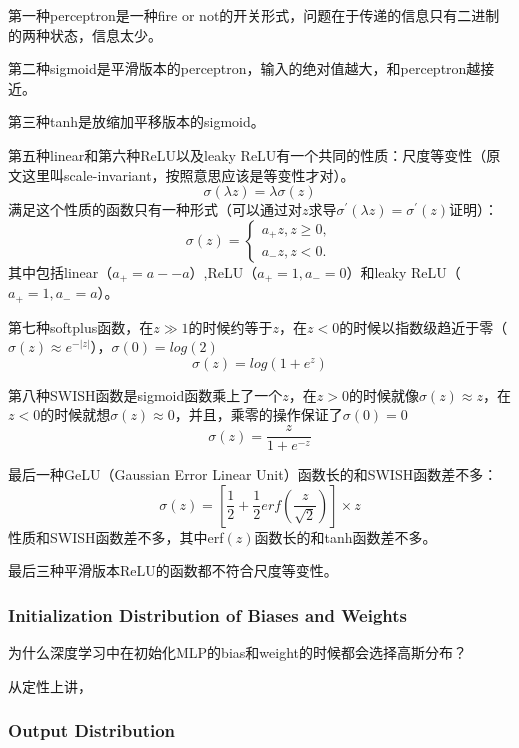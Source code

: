 第一种perceptron是一种fire or not的开关形式，问题在于传递的信息只有二进制的两种状态，信息太少。

第二种sigmoid是平滑版本的perceptron，输入的绝对值越大，和perceptron越接近。

第三种tanh是放缩加平移版本的sigmoid。

第五种linear和第六种ReLU以及leaky ReLU有一个共同的性质：尺度等变性（原文这里叫scale-invariant，按照意思应该是等变性才对）。
\begin{equation}
    \sigma(\lambda z)=\lambda \sigma(z)
\end{equation}
满足这个性质的函数只有一种形式（可以通过对$z$求导$\sigma^{'}(\lambda z)=\sigma^{'}(z)$证明）：
\begin{equation}
    \sigma(z)=\left\{
        \begin{aligned}
            a_{+}z, z\geq 0,\\
            a_{-}z, z< 0.
        \end{aligned}
    \right.
\end{equation}
其中包括linear（$a_{+}=a{-}-a$）,ReLU（$a_{+}=1, a_{-}=0$）和leaky ReLU（$a_{+}=1, a_{-}=a$）。

第七种softplus函数，在$z\gg 1$的时候约等于$z$，在$z<0$的时候以指数级趋近于零（$\sigma(z)\approx e^{-|z|}$），$\sigma(0)=log(2)$
\begin{equation}
    \sigma(z)=log(1+e^z)
\end{equation}

第八种SWISH函数是sigmoid函数乘上了一个$z$，在$z>0$的时候就像$\sigma(z)\approx z$，在$z<0$的时候就想$\sigma(z)\approx 0$，并且，乘零的操作保证了$\sigma(0)=0$
\begin{equation}
    \sigma(z)=\frac{z}{1+e^{-z}}
\end{equation}

最后一种GeLU（Gaussian Error Linear Unit）函数长的和SWISH函数差不多：
\begin{equation}
    \sigma(z)=[\frac{1}{2}+\frac{1}{2}erf(\frac{z}{\sqrt{2}})]\times z
\end{equation}
性质和SWISH函数差不多，其中erf$(z)$函数长的和tanh函数差不多。

最后三种平滑版本ReLU的函数都不符合尺度等变性。

\subsubsection{Initialization Distribution of Biases and Weights}
为什么深度学习中在初始化MLP的bias和weight的时候都会选择高斯分布？

从定性上讲，

\subsubsection{Output Distribution}
